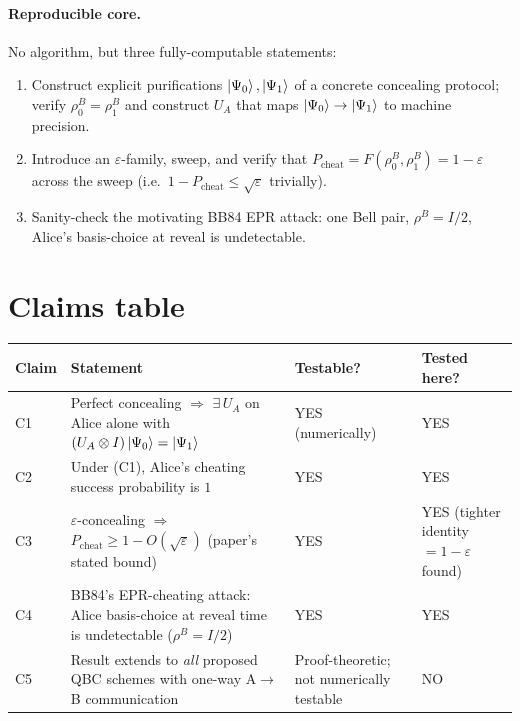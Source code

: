 \documentclass[11pt]{article}
\begin{document}
\paragraph{Reproducible core.}
No algorithm, but three fully-computable statements:
\begin{enumerate}[label=(C\arabic*),leftmargin=*]
\item Construct explicit purifications $\ket{\Psi_0},\ket{\Psi_1}$ of a
      concrete concealing protocol; verify $\rho^B_0=\rho^B_1$ and
      construct $U_A$ that maps $\ket{\Psi_0}\to\ket{\Psi_1}$ to machine
      precision.
\item Introduce an $\varepsilon$-family, sweep, and verify that
      $P_\mathrm{cheat}=F(\rho^B_0,\rho^B_1)=1-\varepsilon$ across the
      sweep (i.e.\ $1-P_\mathrm{cheat}\le\sqrt{\varepsilon}$ trivially).
\item Sanity-check the motivating BB84 EPR attack: one Bell pair,
      $\rho^B=I/2$, Alice's basis-choice at reveal is undetectable.
\end{enumerate}

\section{Claims table}

\begin{center}
\begin{tabular}{@{}p{1.4cm}p{7.5cm}p{2.4cm}p{2.4cm}@{}}
\toprule
Claim & Statement & Testable? & Tested here? \\\midrule
C1 & Perfect concealing $\Rightarrow$ $\exists\,U_A$ on Alice alone with
     $(U_A\otimes I)\ket{\Psi_0}=\ket{\Psi_1}$ & YES (numerically) & YES \\
C2 & Under (C1), Alice's cheating success probability is $1$ & YES & YES \\
C3 & $\varepsilon$-concealing $\Rightarrow$
     $P_\mathrm{cheat}\ge 1-O(\sqrt{\varepsilon})$ (paper's stated bound) &
     YES & YES (tighter identity $=1-\varepsilon$ found) \\
C4 & BB84's EPR-cheating attack: Alice basis-choice at reveal time is
     undetectable ($\rho^B=I/2$) & YES & YES \\
C5 & Result extends to \emph{all} proposed QBC schemes with one-way A$\to$B
     communication & Proof-theoretic; not numerically testable & NO \\
\bottomrule
\end{tabular}
\end{center}
\end{document}
